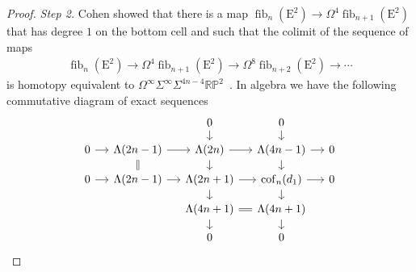 \documentclass[dvipsnames,table]{amsart}
\theoremstyle{definition}
\theoremstyle{remark}
\numberwithin{equation}{section}
\begin{document}
\begin{proof}
\textit{Step 2.}
Cohen showed that there is a map $\operatorname{fib}_n(\mathrm{E}^2) \to \Omega^4\operatorname{fib}_{n+1}(\mathrm{E}^2)$ that has degree $1$ on the bottom cell and such that the colimit of the sequence of maps
    \begin{align*}
      \operatorname{fib}_n(\mathrm{E}^2) \to \Omega^4 \operatorname{fib}_{n+1}(\mathrm{E}^2) \to \Omega^8 \operatorname{fib}_{n+2}(\mathrm{E}^2) \to \cdots
    \end{align*}
    is homotopy equivalent to $\Omega^{\infty}\Sigma^{\infty}\Sigma^{4n - 4}\mathbb{RP}^2$~\cite[Propositions~1.3 and~1.4]{Cohen_1983}. In algebra we have the following commutative diagram of exact sequences
\[\begin{tikzcd}[row sep=small, column sep=small]
	  &                  & 0                & 0                            &   \\
	0 & \Lambda(2n - 1)  & \Lambda(2n)      & \Lambda(4n - 1)              & 0 \\
	0 & \Lambda(2n - 1)  & \Lambda(2n + 1)  & \operatorname{cof}_n(d_1)    & 0 \\
	  &                  & \Lambda(4n + 1)  & \Lambda(4n + 1)              &   \\
	  &                  & 0                & 0                            &
	\arrow[from=2-1, to=2-2] \arrow[from=2-2, to=2-3] \arrow[from=2-3, to=2-4] \arrow[from=2-4, to=2-5]
	\arrow[from=3-1, to=3-2] \arrow[from=3-2, to=3-3] \arrow[from=3-3, to=3-4] \arrow[from=3-4, to=3-5]
	\arrow[from=1-3, to=2-3] \arrow[from=2-3, to=3-3] \arrow[from=3-3, to=4-3] \arrow[from=4-3, to=5-3]
	\arrow[from=1-4, to=2-4] \arrow[from=2-4, to=3-4] \arrow[from=3-4, to=4-4] \arrow[from=4-4, to=5-4]
	\arrow[equals, from=2-2, to=3-2] \arrow[equals, from=4-3, to=4-4]
\end{tikzcd}\]

\end{proof}
\end{document}
